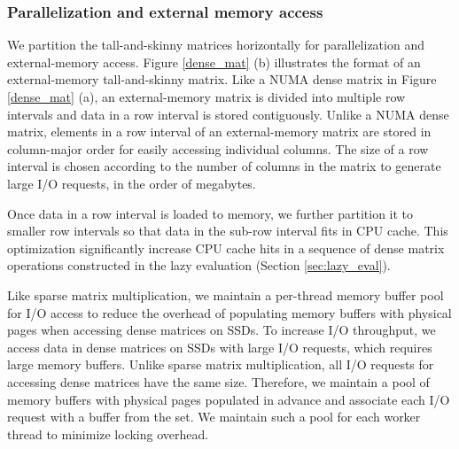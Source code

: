 %		

\subsubsection{Parallelization and external memory access} \label{par_em}
We partition the tall-and-skinny matrices horizontally for parallelization
and external-memory access. Figure \ref{dense_mat} (b) illustrates the format
of an external-memory tall-and-skinny matrix. Like a NUMA dense matrix in
Figure \ref{dense_mat} (a),
an external-memory matrix is divided into multiple row intervals and data
in a row interval is stored contiguously. Unlike a NUMA dense matrix, elements
in a row interval of an external-memory matrix are stored in column-major order
for easily accessing individual columns. The size of a row interval is chosen
according to the number of columns in the matrix to generate large I/O requests,
in the order of megabytes.

Once data in a row interval is loaded to memory, we further partition it to
smaller row intervals so that data
in the sub-row interval fits in CPU cache.  This optimization significantly
increase CPU cache hits in a sequence of dense matrix operations constructed in
the lazy evaluation (Section \ref{sec:lazy_eval}).

Like sparse matrix multiplication, we maintain a per-thread memory buffer pool
for I/O access to reduce the overhead of populating memory buffers with
physical pages when accessing dense matrices on SSDs. To increase I/O throughput,
we access data in dense
matrices on SSDs with large I/O requests, which requires large memory buffers.
Unlike sparse matrix multiplication, all I/O requests for accessing dense
matrices have the same size. Therefore, we maintain a pool of memory buffers
with physical pages populated in advance and associate each I/O request with
a buffer from the set. We maintain such a pool for each worker thread to
minimize locking overhead.

